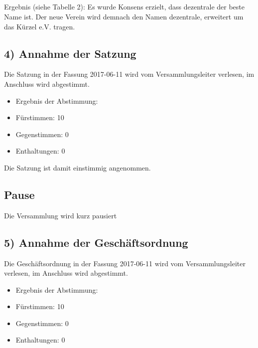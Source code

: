\documentclass[10pt,a4paper]{scrartcl}
\newcommand{\qs}[1]{\glqq#1\grqq}
\begin{document}
\\
\\
\\
\\
    Ergebnis (siehe Tabelle 2): Es wurde Konsens erzielt, dass \qs{dezentrale} der beste Name ist.
    Der neue Verein wird demnach den Namen dezentrale, erweitert um das K{\"u}rzel \qs{e.V.} tragen.

\subsection*{4) Annahme der Satzung}
        Die Satzung in der Fassung 2017-06-11 wird vom Versammlungsleiter verlesen, im Anschluss wird abgestimmt.
\begin{itemize}
\item Ergebnis der Abstimmung:
\item F{\"u}rstimmen: 10
\item Gegenstimmen: 0
\item Enthaltungen: 0
\end{itemize}

Die Satzung ist damit einstimmig angenommen.
\subsection*{Pause}
    Die Versammlung wird kurz pausiert
\subsection*{5) Annahme der Gesch{\"a}ftsordnung}
        Die Gesch{\"a}ftsordnung in der Fassung 2017-06-11 wird vom Versammlungsleiter verlesen, im Anschluss wird abgestimmt.
\begin{itemize}
\item Ergebnis der Abstimmung:
\item F{\"u}rstimmen: 10
\item Gegenstimmen: 0
\item Enthaltungen: 0
\end{itemize}
\end{document}
